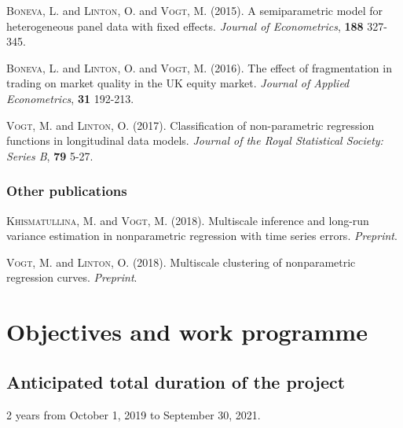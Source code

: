 \documentclass[a4paper,12pt]{article}
\begin{document}
{\small

\hangindent=0.4cm \textsc{Boneva}, L. and \textsc{Linton}, O. and \textsc{Vogt}, M. (2015). A semiparametric model for heterogeneous panel data with fixed effects. \textit{Journal of Econometrics}, \textbf{188} 327-345.

\vspace{5pt}

\noindent \hangindent=0.4cm \textsc{Boneva}, L. and \textsc{Linton}, O. and \textsc{Vogt}, M. (2016). The effect of fragmentation in trading on market quality in the UK equity market. \textit{Journal of Applied Econometrics}, \textbf{31} 192-213.

\vspace{5pt}

\noindent \hangindent=0.4cm \textsc{Vogt}, M. and \textsc{Linton}, O. (2017). Classification of non-parametric regression functions in longitudinal data models. \textit{Journal of the Royal Statistical Society: Series B}, \textbf{79} 5-27.

}


\subsubsection{Other publications}


{\small

\hangindent=0.4cm \textsc{Khismatullina}, M. and \textsc{Vogt}, M. (2018). Multiscale inference and long-run variance estimation in nonparametric regression with time series errors. \textit{Preprint}.

\vspace{5pt}

\noindent \hangindent=0.4cm \textsc{Vogt}, M. and \textsc{Linton}, O. (2018). Multiscale clustering of nonparametric regression curves. \textit{Preprint}. 

}



\section{Objectives and work programme}


\subsection{Anticipated total duration of the project}


2 years from October 1, 2019 to September 30, 2021.
\end{document}
